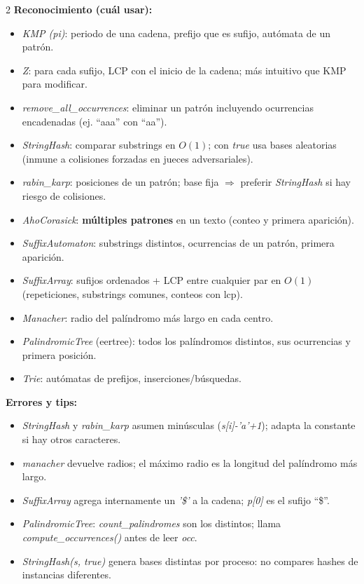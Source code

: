 \documentclass[10pt]{article}
\begin{document}
\begin{multicols}{2}
\textbf{Reconocimiento (cuál usar):}
\begin{itemize}\setlength{\itemsep}{1pt}
  \item \textit{KMP (pi)}: periodo de una cadena, prefijo que es sufijo, autómata de un patrón.
  \item \textit{Z}: para cada sufijo, LCP con el inicio de la cadena; más intuitivo que KMP para modificar.
  \item \textit{remove\_all\_occurrences}: eliminar un patrón incluyendo ocurrencias encadenadas (ej. ``aaa'' con ``aa'').
  \item \textit{StringHash}: comparar substrings en $O(1)$; con \textit{true} usa bases aleatorias (inmune a colisiones forzadas en jueces adversariales).
  \item \textit{rabin\_karp}: posiciones de un patrón; base fija $\Rightarrow$ preferir \textit{StringHash} si hay riesgo de colisiones.
  \item \textit{AhoCorasick}: \textbf{múltiples patrones} en un texto (conteo y primera aparición).
  \item \textit{SuffixAutomaton}: substrings distintos, ocurrencias de un patrón, primera aparición.
  \item \textit{SuffixArray}: sufijos ordenados + LCP entre cualquier par en $O(1)$ (repeticiones, substrings comunes, conteos con lcp).
  \item \textit{Manacher}: radio del palíndromo más largo en cada centro.
  \item \textit{PalindromicTree} (eertree): todos los palíndromos distintos, sus ocurrencias y primera posición.
  \item \textit{Trie}: autómatas de prefijos, inserciones/búsquedas.
\end{itemize}

\textbf{Errores y tips:}
\begin{itemize}\setlength{\itemsep}{1pt}
  \item \textit{StringHash} y \textit{rabin\_karp} asumen minúsculas (\textit{s[i]-'a'+1}); adapta la constante si hay otros caracteres.
  \item \textit{manacher} devuelve radios; el máximo radio es la longitud del palíndromo más largo.
  \item \textit{SuffixArray} agrega internamente un \textit{'\$'} a la cadena; \textit{p[0]} es el sufijo ``\$''.
  \item \textit{PalindromicTree}: \textit{count\_palindromes} son los distintos; llama \textit{compute\_occurrences()} antes de leer \textit{occ}.
  \item \textit{StringHash(s, true)} genera bases distintas por proceso: no compares hashes de instancias diferentes.
\end{itemize}


\end{multicols}
\end{document}
